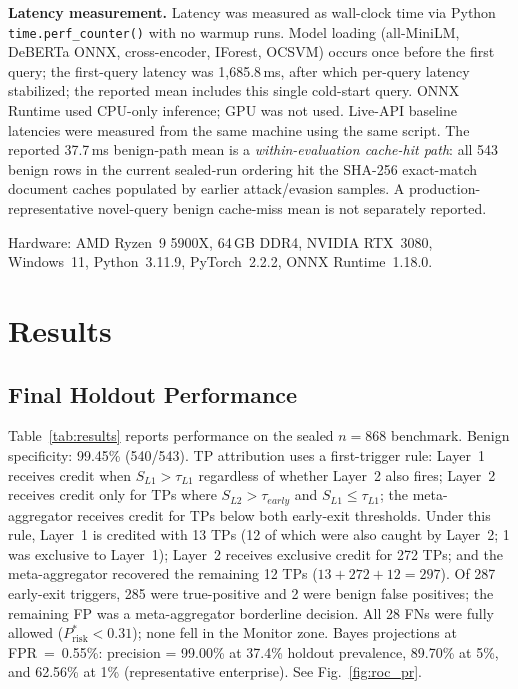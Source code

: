 ﻿\documentclass[conference]{IEEEtran}
\begin{document}
\textbf{Latency measurement.}
Latency was measured as wall-clock time via Python
\texttt{time.perf\_counter()} with no warmup runs.
Model loading (all-MiniLM, DeBERTa ONNX, cross-encoder, IForest, OCSVM)
occurs once before the first query; the first-query latency was
1{,}685.8\,ms, after which per-query latency stabilized; the reported mean
includes this single cold-start query.
ONNX Runtime used CPU-only inference; GPU was not used.
Live-API baseline latencies were measured from the same machine using the
same script.
The reported 37.7\,ms benign-path mean is a \emph{within-evaluation
cache-hit path}: all 543 benign rows in the current sealed-run ordering hit
the SHA-256 exact-match document caches populated by earlier attack/evasion
samples. A production-representative novel-query benign cache-miss mean is
not separately reported.

Hardware: AMD Ryzen~9 5900X, 64\,GB DDR4, NVIDIA RTX~3080, Windows~11,
Python~3.11.9, PyTorch~2.2.2, ONNX Runtime~1.18.0.

\section{Results}
\label{sec:results}

\subsection{Final Holdout Performance}

Table~\ref{tab:results} reports performance on the sealed $n = 868$
benchmark.
Benign specificity: 99.45\% (540/543).
TP attribution uses a first-trigger rule: Layer~1 receives credit when
$S_{L1} > \tau_{L1}$ regardless of whether Layer~2 also fires; Layer~2
receives credit only for TPs where $S_{L2} > \tau_{early}$ and
$S_{L1} \leq \tau_{L1}$; the meta-aggregator receives credit for TPs below
both early-exit thresholds.
Under this rule, Layer~1 is credited with 13 TPs (12 of which were also
caught by Layer~2; 1 was exclusive to Layer~1); Layer~2 receives exclusive
credit for 272 TPs; and the meta-aggregator recovered the remaining 12 TPs
($13 + 272 + 12 = 297$).
Of 287 early-exit triggers, 285 were true-positive and 2 were benign false
positives; the remaining FP was a meta-aggregator borderline decision.
All 28 FNs were fully allowed ($P_{\mathrm{risk}}^{*} < 0.31$); none fell
in the Monitor zone.
Bayes projections at FPR~=~0.55\%: precision = 99.00\% at 37.4\% holdout
prevalence, 89.70\% at 5\%, and 62.56\% at 1\% (representative enterprise).
See Fig.~\ref{fig:roc_pr}.
\end{document}
